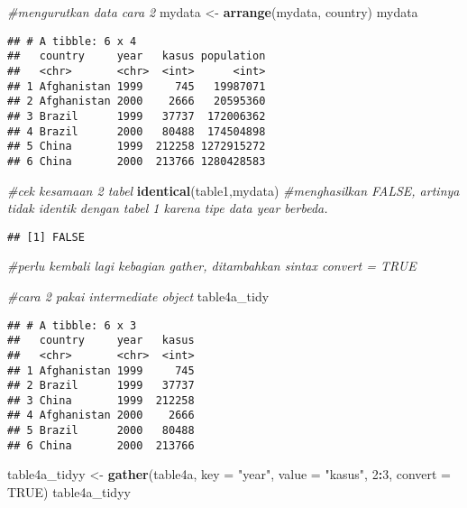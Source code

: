\documentclass[]{article}
\newenvironment{Shaded}{\begin{snugshade}}{\end{snugshade}}
\newcommand{\CommentTok}[1]{\textcolor[rgb]{0.56,0.35,0.01}{\textit{#1}}}
\newcommand{\DataTypeTok}[1]{\textcolor[rgb]{0.13,0.29,0.53}{#1}}
\newcommand{\DecValTok}[1]{\textcolor[rgb]{0.00,0.00,0.81}{#1}}
\newcommand{\KeywordTok}[1]{\textcolor[rgb]{0.13,0.29,0.53}{\textbf{#1}}}
\newcommand{\NormalTok}[1]{#1}
\newcommand{\OperatorTok}[1]{\textcolor[rgb]{0.81,0.36,0.00}{\textbf{#1}}}
\newcommand{\OtherTok}[1]{\textcolor[rgb]{0.56,0.35,0.01}{#1}}
\newcommand{\StringTok}[1]{\textcolor[rgb]{0.31,0.60,0.02}{#1}}
\begin{document}
\begin{Shaded}
\begin{Highlighting}[]
\CommentTok{#mengurutkan data cara 2}
\NormalTok{mydata <-}\StringTok{ }\KeywordTok{arrange}\NormalTok{(mydata, country)}
\NormalTok{mydata}
\end{Highlighting}
\end{Shaded}

\begin{verbatim}
## # A tibble: 6 x 4
##   country     year   kasus population
##   <chr>       <chr>  <int>      <int>
## 1 Afghanistan 1999     745   19987071
## 2 Afghanistan 2000    2666   20595360
## 3 Brazil      1999   37737  172006362
## 4 Brazil      2000   80488  174504898
## 5 China       1999  212258 1272915272
## 6 China       2000  213766 1280428583
\end{verbatim}

\begin{Shaded}
\begin{Highlighting}[]
\CommentTok{#cek kesamaan 2 tabel}
\KeywordTok{identical}\NormalTok{(table1,mydata) }\CommentTok{#menghasilkan FALSE, artinya tidak identik dengan tabel 1 karena tipe data year berbeda.}
\end{Highlighting}
\end{Shaded}

\begin{verbatim}
## [1] FALSE
\end{verbatim}

\begin{Shaded}
\begin{Highlighting}[]
\CommentTok{#perlu kembali lagi kebagian gather, ditambahkan sintax convert = TRUE}

\CommentTok{#cara 2 pakai intermediate object}
\NormalTok{table4a_tidy}
\end{Highlighting}
\end{Shaded}

\begin{verbatim}
## # A tibble: 6 x 3
##   country     year   kasus
##   <chr>       <chr>  <int>
## 1 Afghanistan 1999     745
## 2 Brazil      1999   37737
## 3 China       1999  212258
## 4 Afghanistan 2000    2666
## 5 Brazil      2000   80488
## 6 China       2000  213766
\end{verbatim}

\begin{Shaded}
\begin{Highlighting}[]
\NormalTok{table4a_tidyy <-}\StringTok{ }\KeywordTok{gather}\NormalTok{(table4a, }\DataTypeTok{key =} \StringTok{"year"}\NormalTok{, }\DataTypeTok{value =} \StringTok{"kasus"}\NormalTok{, }\DecValTok{2}\OperatorTok{:}\DecValTok{3}\NormalTok{, }\DataTypeTok{convert =} \OtherTok{TRUE}\NormalTok{) }
\NormalTok{table4a_tidyy}
\end{Highlighting}
\end{Shaded}
\end{document}
